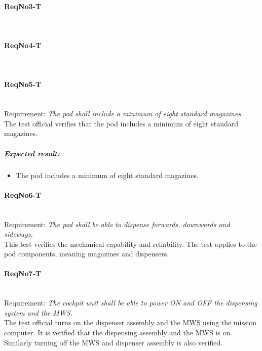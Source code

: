 \paragraph{ReqNo3-T}\mbox{}\\ %


\paragraph{ReqNo4-T}\mbox{}\\ %

\paragraph{ReqNo5-T}\mbox{}\\ %
Requirement: \textit{The pod shall include a minimum of eight standard magazines.}\\

The test official verifies that the pod includes a minimum of eight standard magazines.

\subparagraph{Expected result:}
	\begin{itemize}
	\item The pod includes a minimum of eight standard magazines.
	\end{itemize}

\paragraph{ReqNo6-T}\mbox{}\\ %
Requirement: \textit{The pod shall be able to dispense forwards, downwards and sideways.}\\
This test verifies the mechanical capability and reliability. The test applies to the pod components, meaning magazines and dispensers.
\paragraph{ReqNo7-T}\mbox{}\\ %
Requirement: \textit{The cockpit unit shall be able to power ON and OFF the dispensing system and the MWS.}\\
The test official turns on the dispenser assembly and the MWS using the mission computer. It is verified that the dispensing assembly and the MWS is on. Similarly turning off the MWS and dispenser assembly is also verified.

